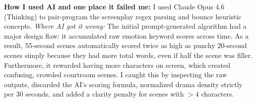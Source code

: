 \documentclass[9.5pt,a4paper]{article}
\begin{document}
\textbf{How I used AI and one place it failed me:}
I used Claude Opus 4.6 (Thinking) to pair-program the screenplay regex parsing and bounce heuristic concepts.
\textit{Where AI got it wrong:} The initial prompt-generated algorithm had a major design flaw: it accumulated raw emotion keyword scores across time. As a result, 55-second scenes automatically scored twice as high as punchy 20-second scenes simply because they had more total words, even if half the scene was filler. Furthermore, it rewarded having more characters on screen, which created confusing, crowded courtroom scenes. I caught this by inspecting the raw outputs, discarded the AI's scoring formula, normalized drama density strictly per 30 seconds, and added a clarity penalty for scenes with $>4$ characters.
\end{document}
